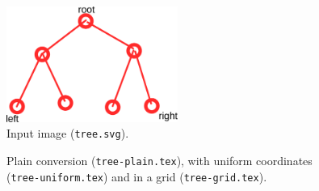
\begin{figure}[H]
\centering
\includegraphics[width=0.5\textwidth]{tree.pdf}
\caption{Input image (\texttt{tree.svg}).}
\end{figure}

\begin{figure}[H]
\begin{minipage}{0.3\textwidth}
\begin{tikzpicture}

\end{tikzpicture}
\end{minipage}
\begin{minipage}{0.3\textwidth}
\begin{tikzpicture}

\end{tikzpicture}
\end{minipage}
\begin{minipage}{0.3\textwidth}
\begin{tikzpicture}

\end{tikzpicture}
\end{minipage}
\caption{Plain conversion (\texttt{tree-plain.tex}), with uniform coordinates (\texttt{tree-uniform.tex}) and in a grid (\texttt{tree-grid.tex}).}
\end{figure}
